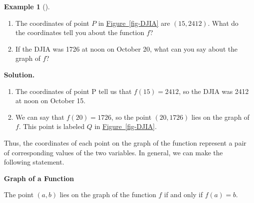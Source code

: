 \documentclass[10pt,]{book}
\theoremstyle{plain}
\theoremstyle{definition}
\theoremstyle{definition}
\newtheorem{example}[theorem]{Example}
\theoremstyle{definition}
\theoremstyle{definition}
\numberwithin{equation}{section}
\begin{document}
\begin{example}[]\label{example-DJIA}
\leavevmode%
\begin{enumerate}[label=*\alph**]
\item\hypertarget{li-117}{}The coordinates of point \(P\) in \hyperref[fig-DJIA]{Figure~\ref{fig-DJIA}} are \((15, 2412)\). What do the coordinates tell you about the function \(f\)?\item\hypertarget{li-118}{}If the DJIA was 1726 at noon on October 20, what can you say about the graph of \(f\)?\end{enumerate}
\par\medskip\noindent%
\textbf{Solution.}\quad \leavevmode%
\begin{enumerate}[label=*\alph**]
\item\hypertarget{li-119}{}The coordinates of point P tell us that \(f(15) = 2412\), so the DJIA was 2412 at noon on October 15.\item\hypertarget{li-120}{}We can say that \(f(20) = 1726\), so the point \((20, 1726)\) lies on the graph of \(f\). This point is labeled \(Q\) in \hyperref[fig-DJIA]{Figure~\ref{fig-DJIA}}.\end{enumerate}
\end{example}
\par
Thus, the coordinates of each point on the graph of the function represent a pair of corresponding
values of the two variables. In general, we can make the following statement.%
\begin{mdframed}[style=assemblage]%
\noindent\textbf{\large Graph of a Function}\label{assemblage-6}\par\medskip
The point \((a, b)\) lies on the graph of the function \(f\) if and only if \(f(a)=b\).
%
\end{mdframed}
\end{document}
